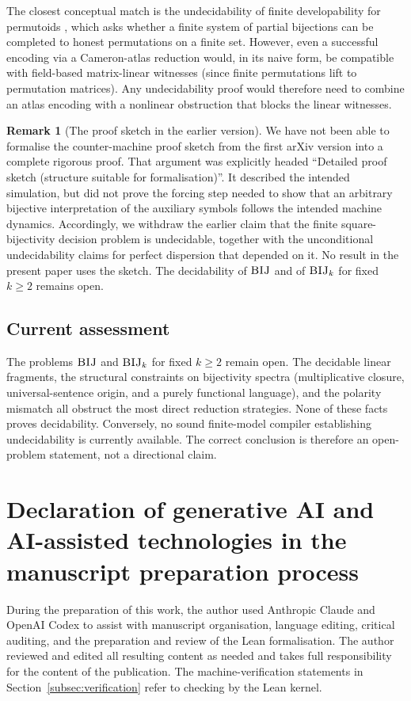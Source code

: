 \documentclass[11pt]{article}
\newcommand{\parencite}[1]{\citep{#1}}
\theoremstyle{definition}
\newtheorem{remark}{Remark}[section]
\theoremstyle{plain}
\begin{document}
The closest conceptual match is the undecidability of finite developability for permutoids \parencite{bridson2017undecidability}, which
asks whether a finite system of partial bijections can be completed to honest permutations on a finite set.
However, even a successful encoding via a Cameron-atlas reduction would, in its naive form, be compatible with
field-based matrix-linear witnesses (since finite permutations lift to permutation matrices).  Any undecidability
proof would therefore need to combine an atlas encoding with a nonlinear obstruction that blocks the linear witnesses.

\begin{remark}[The proof sketch in the earlier version]
\label{rem:earlier-proof-sketch}
We have not been able to formalise the counter-machine proof sketch from the first arXiv version into a complete
rigorous proof.  That argument was explicitly headed \enquote{Detailed proof sketch (structure suitable for
formalisation)}.  It described the intended simulation, but did not prove the forcing step needed to show that
an arbitrary bijective interpretation of the auxiliary symbols follows the intended machine dynamics.
Accordingly, we withdraw the earlier claim that the finite square-bijectivity decision problem is
undecidable, together with the unconditional undecidability claims for perfect dispersion that depended on it.
No result in the present paper uses the sketch.  The decidability of $\textsc{BIJ}$ and of $\textsc{BIJ}_k$ for
fixed $k\ge2$ remains open.
\end{remark}

\subsection{Current assessment}
The problems $\textsc{BIJ}$ and $\textsc{BIJ}_k$ for fixed $k\ge 2$ remain open.  The decidable linear
fragments, the structural constraints on bijectivity spectra (multiplicative closure, universal-sentence origin,
and a purely functional language), and the polarity mismatch all obstruct the most direct reduction strategies.
None of these facts proves decidability.  Conversely, no sound finite-model compiler establishing
undecidability is currently available.  The correct conclusion is therefore an open-problem statement, not a
directional claim.

\section*{Declaration of generative AI and AI-assisted technologies in the manuscript preparation process}
During the preparation of this work, the author used Anthropic Claude and OpenAI Codex to assist with manuscript
organisation, language editing, critical auditing, and the preparation and review of the Lean formalisation.
The author reviewed and edited all resulting content as needed and takes full responsibility for the content of
the publication.  The machine-verification statements in Section~\ref{subsec:verification} refer to checking by
the Lean kernel.



\end{document}
